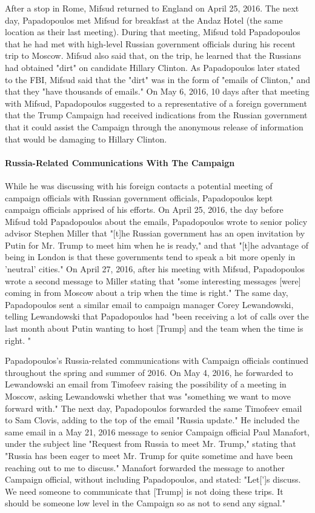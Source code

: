 After a stop in Rome, Mifsud returned to England on April 25, 2016.%
The next day, Papadopoulos met Mifsud for breakfast at the Andaz Hotel (the same location as their last meeting).%
During that meeting, Mifsud told Papadopoulos that he had met with high-level Russian government officials during his recent trip to Moscow.
Mifsud also said that, on the trip, he learned that the Russians had obtained "dirt" on candidate Hillary Clinton.
As Papadopoulos later stated to the FBI, Mifsud said that the "dirt" was in the form of "emails of Clinton," and that they "have thousands of emails."%
On May 6, 2016, 10 days after that meeting with Mifsud, Papadopoulos suggested to a representative of a foreign government that the Trump Campaign had received indications from the Russian government that it could assist the Campaign through the anonymous release of information that would be damaging to Hillary Clinton.%

\paragraph{Russia-Related Communications With The Campaign}

While he was discussing with his foreign contacts a potential meeting of campaign officials with Russian government officials, Papadopoulos kept campaign officials apprised of his efforts.
On April 25, 2016, the day before Mifsud told Papadopoulos about the emails, Papadopoulos wrote to senior policy advisor Stephen Miller that "[t]he Russian government has an open invitation by Putin for Mr. Trump to meet him when he is ready," and that "[t]he advantage of being in London is that these governments tend to speak a bit more openly in 'neutral' cities."%
On April 27, 2016, after his meeting with Mifsud, Papadopoulos wrote a second message to Miller stating that "some interesting messages [were] coming in from Moscow about a trip when the time is right."%
The same day, Papadopoulos sent a similar email to campaign manager Corey Lewandowski, telling Lewandowski that Papadopoulos had "been receiving a lot of calls over the last month about Putin wanting to host [Trump] and the team when the time is right. "%

Papadopoulos's Russia-related communications with Campaign officials continued throughout the spring and summer of 2016.
On May 4, 2016, he forwarded to Lewandowski an email from Timofeev raising the possibility of a meeting in Moscow, asking Lewandowski whether that was "something we want to move forward with."%
The next day, Papadopoulos forwarded the same Timofeev email to Sam Clovis, adding to the top of the email "Russia update."%
He included the same email in a May 21, 2016 message to senior Campaign official Paul Manafort, under the subject line "Request from Russia to meet Mr. Trump," stating that "Russia has been eager to meet Mr. Trump for quite sometime and have been reaching out to me to discuss."%
Manafort forwarded the message to another Campaign official, without including Papadopoulos, and stated: "Let[']s discuss.
We need someone to communicate that [Trump] is not doing these trips.
It should be someone low level in the Campaign so as not to send any signal."%

